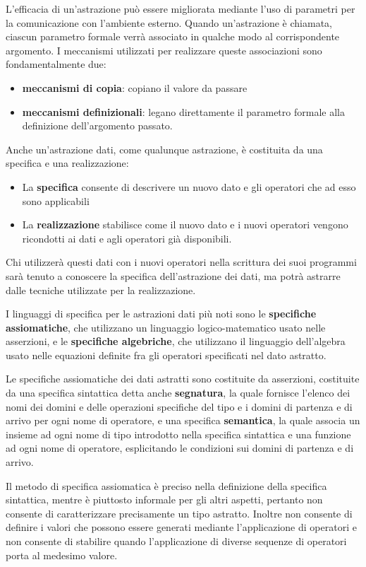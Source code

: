 \documentclass[a4paper,18pt]{extarticle}
\begin{document}
L'efficacia di un'astrazione può essere migliorata mediante l'uso di parametri per la comunicazione con l'ambiente esterno. Quando un'astrazione è chiamata, ciascun parametro formale verrà associato in qualche modo al corrispondente argomento. I meccanismi utilizzati per realizzare queste associazioni sono fondamentalmente due:
\begin{itemize}
  \item \textbf{meccanismi di copia}: copiano il valore da passare
  \item \textbf{meccanismi definizionali}: legano direttamente il parametro formale alla definizione dell'argomento passato.
\end{itemize}

Anche un'astrazione dati, come qualunque astrazione, è costituita da una specifica e una realizzazione:
\begin{itemize}
  \item La \textbf{specifica} consente di descrivere un nuovo dato e gli operatori che ad esso sono applicabili
  \item La \textbf{realizzazione} stabilisce come il nuovo dato e i nuovi operatori vengono ricondotti ai dati e agli operatori già disponibili.
\end{itemize}
 Chi utilizzerà questi dati con i nuovi operatori nella scrittura dei suoi programmi sarà tenuto a conoscere la specifica dell'astrazione dei dati, ma potrà astrarre dalle tecniche utilizzate per la realizzazione.
 
 I linguaggi di specifica per le astrazioni dati più noti sono le \textbf{specifiche assiomatiche}, che utilizzano un linguaggio logico-matematico usato nelle asserzioni, e le \textbf{specifiche algebriche}, che utilizzano il linguaggio dell'algebra usato nelle equazioni definite fra gli operatori specificati nel dato astratto.
 
 Le specifiche assiomatiche dei dati astratti sono costituite da asserzioni, costituite da una specifica sintattica detta anche \textbf{segnatura}, la quale fornisce l'elenco dei nomi dei domini  e delle operazioni specifiche del tipo e i domini di partenza e di arrivo per ogni nome di operatore, e una specifica \textbf{semantica}, la quale associa un insieme ad ogni nome di tipo introdotto nella specifica sintattica e una funzione ad ogni nome di operatore, esplicitando le condizioni sui domini di partenza e di arrivo.
 
 Il metodo di specifica assiomatica è preciso nella definizione della specifica sintattica, mentre è piuttosto informale per gli altri aspetti, pertanto non consente di caratterizzare precisamente un tipo astratto. Inoltre non consente di definire i valori che possono essere generati mediante l'applicazione di operatori e non consente di stabilire quando l'applicazione di diverse sequenze di operatori porta al medesimo valore.
 
\end{document}
